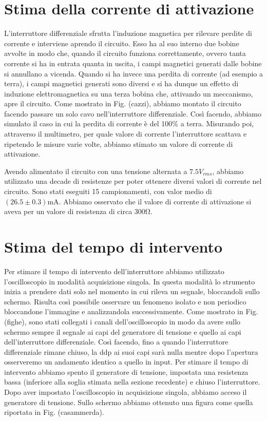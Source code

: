 \section{Stima della corrente di attivazione}
L'interruttore differenziale sfrutta l'induzione magnetica per rilevare perdite di corrente e interviene aprendo il circuito. Esso ha al suo interno due bobine avvolte in modo che, quando il circuito funziona correttamente, ovvero tanta corrente si ha in entrata quanta in uscita, i campi magnetici generati dalle bobine si annullano a vicenda. Quando si ha invece una perdita di corrente (ad esempio a terra), i campi magnetici generati sono diversi e si ha dunque un effetto di induzione elettromagnetica su una terza bobina che, attivando un meccanismo, apre il circuito. Come mostrato in Fig. (cazzi), abbiamo montato il circuito facendo passare un solo cavo nell'interruttore differenziale. Così facendo, abbiamo simulato il caso in cui la perdita di corrente è del 100\% a terra. Misurando poi, attraverso il multimetro, per quale valore di corrente l'interruttore scattava e ripetendo le misure varie volte, abbiamo stimato un valore di corrente di attivazione. 

Avendo alimentato il circuito con una tensione alternata a $7.5V_{rms}$, abbiamo utilizzato una decade di resistenze per poter ottenere diversi valori di corrente nel circuito. Sono stati eseguiti 15 campionamenti, con valor medio di $(26.5\pm0.3)\si{\milli\ampere}$. Abbiamo osservato che il valore di corrente di attivazione si aveva per un valore di resistenza di circa $300\si{\ohm}$. 


\section{Stima del tempo di intervento}
Per stimare il tempo di intervento dell'interruttore abbiamo utilizzato l'oscilloscopio in modalità acquisizione singola. In questa modalità lo strumento inizia a prendere dati solo nel momento in cui rileva un segnale, bloccandoli sullo schermo. Risulta così possibile osservare un fenomeno isolato e non periodico bloccandone l'immagine e analizzandola successivamente. Come mostrato in Fig.(fighe), sono stati collegati i canali dell'oscilloscopio in modo da avere sullo schermo sempre il segnale ai capi del generatore di tensione e quello ai capi dell'interruttore differenziale. Così facendo, fino a quando l'interruttore differenziale rimane chiuso, la ddp ai suoi capi sarà nulla mentre dopo l'apertura osserveremo un andamento identico a quello in input. Per stimare il tempo di intervento abbiamo spento il generatore di tensione, impostata una resistenza bassa (inferiore alla soglia stimata nella sezione recedente) e chiuso l'interruttore. Dopo aver impostato l'oscilloscopio in acquisizione singola, abbiamo acceso il generatore di tensione. Sullo schermo abbiamo ottenuto una figura come quella riportata in Fig. (casammerda). 

